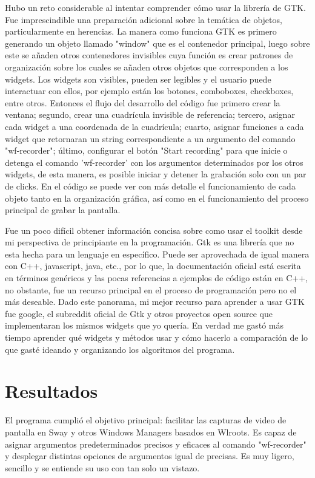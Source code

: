 \documentclass[conference]{IEEEtran}
\begin{document}
Hubo un reto considerable al intentar comprender cómo usar la librería de GTK. Fue imprescindible una preparación adicional sobre la temática de objetos, particularmente en herencias. La manera como funciona GTK es primero generando un objeto llamado "window" que es el contenedor principal, luego sobre este se añaden otros contenedores invisibles cuya función es crear patrones de organización sobre los cuales se añaden otros objetos que corresponden a los widgets. Los widgets son visibles, pueden ser
legibles y el usuario puede interactuar con ellos, por ejemplo están los botones, comboboxes, checkboxes, entre otros. Entonces el flujo del desarrollo del código fue primero crear la ventana; segundo, crear una cuadrícula invisible de referencia; tercero, asignar cada widget a una coordenada de la cuadrícula; cuarto, asignar funciones a cada widget que retornaran un string correspondiente a un argumento del comando "wf-recorder"; último, configurar el botón "Start recording" para que inicie o
detenga el comando 'wf-recorder' con los argumentos determinados por los otros widgets, de esta manera, es posible iniciar y detener la grabación solo con un par de clicks. En el código se puede ver con más detalle el funcionamiento de cada objeto tanto en la organización gráfica, así como en el funcionamiento del proceso principal de grabar la pantalla.

Fue un poco difícil obtener información concisa sobre como usar el toolkit desde mi perspectiva de principiante en la programación. Gtk es una librería que no esta hecha para un lenguaje en específico. Puede ser aprovechada de igual manera con C++, javascript, java, etc., por lo que, la documentación oficial está escrita en términos genéricos y las pocas referencias a ejemplos de código están en C++, no obstante, fue un recurso principal en el proceso de programación pero no el más
deseable. Dado este panorama, mi mejor recurso para aprender a usar GTK fue google, el subreddit oficial
de Gtk y otros proyectos open source que implementaran los mismos widgets que yo quería. En verdad me gastó más tiempo aprender qué widgets y métodos usar y cómo hacerlo a comparación de lo que gasté ideando y organizando los algoritmos del programa.

\section{Resultados}
El programa cumplió el objetivo principal: facilitar las capturas de video de pantalla en Sway y otros Windows Managers basados en Wlroots. Es capaz de asignar argumentos predeterminados precisos y eficaces al comando "wf-recorder" y desplegar distintas opciones de argumentos igual de precisas. Es muy ligero, sencillo y se entiende su uso con tan solo un vistazo.
\end{document}
